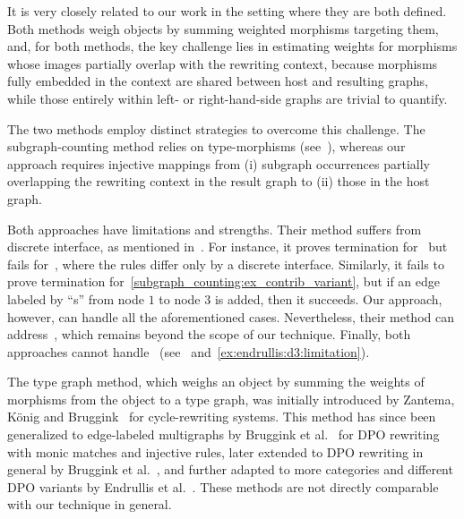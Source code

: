 It is very closely related to our work in the setting where they are both defined. Both methods weigh objects by summing weighted morphisms targeting them, and, for both methods, the key challenge lies in estimating weights for morphisms whose images partially overlap with the rewriting context, because morphisms fully embedded in the context are shared between host and resulting graphs, while those entirely within left- or right-hand-side graphs are trivial to quantify.  

The two methods employ distinct strategies to overcome this challenge. The subgraph-counting method relies on type-morphisms (see~\cite[page 9, remark 4.11, Lemma 4.23]{overbeek2024termination_lmcs}), whereas our approach requires injective mappings from (i) subgraph occurrences partially overlapping the rewriting context in the result graph to (ii) those in the host graph.

Both approaches have limitations and strengths. Their method suffers from discrete interface, as mentioned in~\cite[Example 5.5]{overbeek2024termination_lmcs}. For instance, it proves termination for~\cite[Example 5.5]{overbeek2024termination_lmcs} but fails for~\cite[Example 6.3]{endrullis2024generalized_arxiv_v2}, where the rules differ only by a discrete interface. 
Similarly, it fails to prove termination for~\autoref{subgraph_counting:ex_contrib_variant}, but if an edge labeled by ``s'' from node $1$ to node $3$ is added, then it succeeds. Our approach, however, can handle all the aforementioned cases. Nevertheless, their method can address~\cite[Example 4.1]{plump1995ontermination}, which remains beyond the scope of our technique. Finally, both approaches cannot handle~\cite[Example D.3]{endrullis2024generalized_arxiv_v2} (see~\cite[Remark 6.2]{overbeek2024termination_lmcs} and~\autoref{ex:endrullis:d3:limitation}).

The type graph method, which weighs an object by summing the weights of morphisms from the object to a type graph, was initially introduced by Zantema, K{\"o}nig and Bruggink~\cite{zantema2014termination} for cycle-rewriting systems. 
This method has since been generalized to edge-labeled multigraphs by Bruggink et al.~\cite{bruggink2014termination} for DPO rewriting with monic matches and injective rules, later extended to DPO rewriting in general by Bruggink et al.~\cite{bruggink2015proving}, and further adapted to more categories and different DPO variants by Endrullis et al.~\cite{endrullis2024generalized_arxiv_v2}. 
These methods are not directly comparable with our technique in general.

